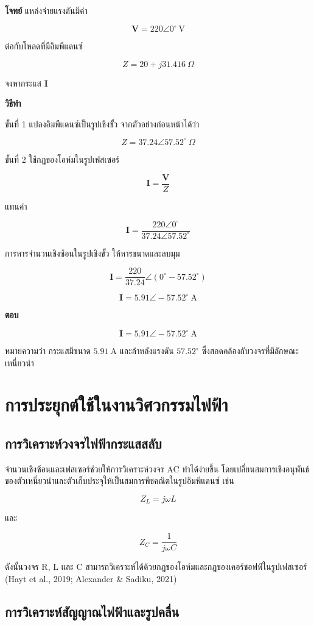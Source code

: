 \textbf{โจทย์}  
แหล่งจ่ายแรงดันมีค่า

\[
\mathbf{V}=220\angle0^\circ\ \text{V}
\]

ต่อกับโหลดที่มีอิมพีแดนซ์

\[
Z=20+j31.416\ \Omega
\]

จงหากระแส $\mathbf{I}$

\textbf{วิธีทำ}

ขั้นที่ 1 แปลงอิมพีแดนซ์เป็นรูปเชิงขั้ว จากตัวอย่างก่อนหน้าได้ว่า

\[
Z=37.24\angle57.52^\circ\ \Omega
\]

ขั้นที่ 2 ใช้กฎของโอห์มในรูปเฟสเซอร์

\[
\mathbf{I}=\frac{\mathbf{V}}{Z}
\]

แทนค่า

\[
\mathbf{I}=\frac{220\angle0^\circ}{37.24\angle57.52^\circ}
\]

การหารจำนวนเชิงซ้อนในรูปเชิงขั้ว ให้หารขนาดและลบมุม

\[
\mathbf{I}=\frac{220}{37.24}\angle(0^\circ-57.52^\circ)
\]

\[
\mathbf{I}=5.91\angle -57.52^\circ\ \text{A}
\]

\textbf{ตอบ}

\[
\mathbf{I}=5.91\angle -57.52^\circ\ \text{A}
\]

หมายความว่า กระแสมีขนาด $5.91\ \text{A}$ และล้าหลังแรงดัน $57.52^\circ$ ซึ่งสอดคล้องกับวงจรที่มีลักษณะเหนี่ยวนำ

\section{การประยุกต์ใช้ในงานวิศวกรรมไฟฟ้า}

\subsection{การวิเคราะห์วงจรไฟฟ้ากระแสสลับ}

จำนวนเชิงซ้อนและเฟสเซอร์ช่วยให้การวิเคราะห์วงจร AC ทำได้ง่ายขึ้น โดยเปลี่ยนสมการเชิงอนุพันธ์ของตัวเหนี่ยวนำและตัวเก็บประจุให้เป็นสมการพีชคณิตในรูปอิมพีแดนซ์ เช่น

\[
Z_L=j\omega L
\]

และ

\[
Z_C=\frac{1}{j\omega C}
\]

ดังนั้นวงจร R, L และ C สามารถวิเคราะห์ได้ด้วยกฎของโอห์มและกฎของเคอร์ชอฟฟ์ในรูปเฟสเซอร์ (Hayt et al., 2019; Alexander \& Sadiku, 2021)

\subsection{การวิเคราะห์สัญญาณไฟฟ้าและรูปคลื่น}

